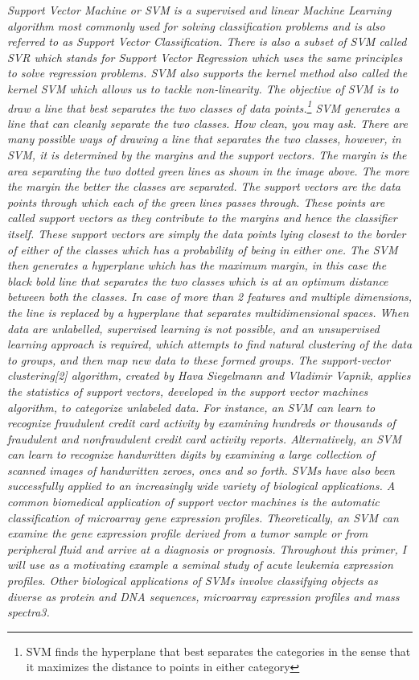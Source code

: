 \documentclass[10pt,a4paper]{report}
\theoremstyle{myn}
\theoremstyle{myu}
\begin{document}
\textit{Support Vector Machine or SVM is a supervised and linear Machine Learning algorithm most commonly used for solving classification problems and is also referred to as Support Vector Classification.\cite{noble2006support} There is also a subset of SVM called SVR which stands for Support Vector Regression which uses the same principles to solve regression problems. SVM also supports the kernel method also called the kernel SVM which allows us to tackle non-linearity. The objective of SVM is to draw a line that best separates the two classes of data points.\footnote{SVM finds the hyperplane that best separates the categories in the sense that it maximizes the distance to points in either category} SVM generates a line that can cleanly separate the two classes. How clean, you may ask. There are many possible ways of drawing a line that separates the two classes, however, in SVM, it is determined by the margins and the support vectors. The margin is the area separating the two dotted green lines as shown in the image above. The more the margin the better the classes are separated. The support vectors are the data points through which each of the green lines passes through. These points are called support vectors as they contribute to the margins and hence the classifier itself. These support vectors are simply the data points lying closest to the border of either of the classes which has a probability of being in either one. The SVM then generates a hyperplane which has the maximum margin, in this case the black bold line that separates the two classes which is at an optimum distance between both the classes. In case of more than 2 features and multiple dimensions, the line is replaced by a hyperplane that separates multidimensional spaces. When data are unlabelled, supervised learning is not possible, and an unsupervised learning approach is required, which attempts to find natural clustering of the data to groups, and then map new data to these formed groups. The support-vector clustering[2] algorithm, created by Hava Siegelmann and Vladimir Vapnik, applies the statistics of support vectors, developed in the support vector machines algorithm, to categorize unlabeled data. For instance, an SVM can learn to recognize fraudulent credit card activity by examining hundreds or thousands of fraudulent and nonfraudulent credit card activity reports. Alternatively, an SVM can learn to recognize handwritten digits by examining a large collection of scanned images of handwritten zeroes, ones and so forth. SVMs have also been successfully applied to an increasingly wide variety of biological applications.\cite{noble2004support} A common biomedical application of support vector machines is the automatic classification of microarray gene expression profiles. Theoretically, an SVM can examine the gene expression profile derived from a tumor sample or from peripheral fluid and arrive at a diagnosis or prognosis. Throughout this primer, I will use as a motivating example a seminal study of acute leukemia expression profiles. Other biological applications of SVMs involve classifying objects as diverse as protein and DNA sequences, microarray expression profiles and mass spectra3.\cite{guyon2002gene}
}
\end{document}
